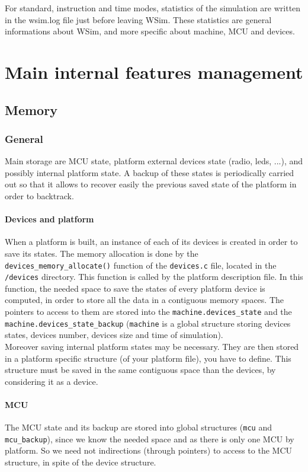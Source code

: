 \documentclass[a4paper,10pt]{report}
\begin{document}
For standard, instruction and time modes, statistics of the simulation are written in the wsim.log file just before leaving WSim. These statistics are general informations about WSim, and more specific about machine, MCU and devices.


\chapter{Main internal features management}

\section{Memory}
\subsection{General}
Main storage are MCU state, platform external devices state (radio, leds, ...), and possibly internal platform state. A backup of these states is periodically carried out so that it allows to recover easily the previous saved state of the platform in order to backtrack.

\subsubsection{Devices and platform}
When a platform is built, an instance of each of its devices is created in order to save its states. The memory allocation  is done by the \verb$devices_memory_allocate()$ function of the \verb$devices.c$ file, located in the \verb$/devices$ directory. This function is called by the platform description file. In this function, the needed space to save the states of every platform device is computed, in order to store all the data in a contiguous memory spaces.  The pointers to access to them are stored into the \verb$machine.devices_state$ and the \verb$machine.devices_state_backup$ (\verb$machine$ is a global structure storing devices states, devices number, devices size and time of simulation).\\

Moreover saving internal platform states may be necessary. They are then stored in a platform specific structure (of your platform file), you have to define. This structure must be saved in the same contiguous space than the devices, by considering it as a device.

\subsubsection{MCU}
The MCU state and its backup are stored into global structures (\verb$mcu$ and \verb$mcu_backup$), since we know the needed space and as there is only one MCU by platform. So we need not indirections (through pointers) to access to the MCU structure, in spite of the device structure.
\end{document}
